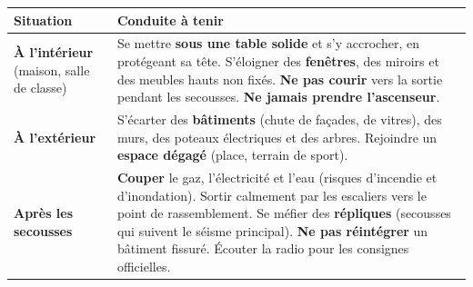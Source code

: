 \documentclass[11pt]{article}
\begin{document}
\begin{center}
\begin{tabularx}{\linewidth}{|l|X|}\hline
\rowcolor{popblueL}
\textbf{Situation} & \textbf{Conduite à tenir} \\ \hline
\textbf{À l'intérieur} (maison, salle de classe) & Se mettre \textbf{sous une table solide} et s'y accrocher, en protégeant sa tête. S'éloigner des \textbf{fenêtres}, des miroirs et des meubles hauts non fixés. \textbf{Ne pas courir} vers la sortie pendant les secousses. \textbf{Ne jamais prendre l'ascenseur}. \\ \hline
\textbf{À l'extérieur} & S'écarter des \textbf{bâtiments} (chute de façades, de vitres), des murs, des poteaux électriques et des arbres. Rejoindre un \textbf{espace dégagé} (place, terrain de sport). \\ \hline
\textbf{Après les secousses} & \textbf{Couper} le gaz, l'électricité et l'eau (risques d'incendie et d'inondation). Sortir calmement par les escaliers vers le point de rassemblement. Se méfier des \textbf{répliques} (secousses qui suivent le séisme principal). \textbf{Ne pas réintégrer} un bâtiment fissuré. Écouter la radio pour les consignes officielles. \\ \hline
\end{tabularx}
\end{center}
\end{document}

